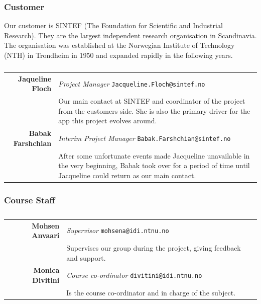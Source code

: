 \subsubsection{Customer}
Our customer is SINTEF (The Foundation for Scientific and Industrial Research). They are the largest independent research organisation in Scandinavia. The organisation was established at the Norwegian Institute of Technology (NTH) in Trondheim in 1950 and expanded rapidly in the following years.

\begin{table}[!ht]
\begin{tabular}{r|p{11cm}}
\textbf{Jaqueline Floch} & \emph{Project Manager}   \texttt{Jacqueline.Floch@sintef.no}\\[4pt]
& Our main contact at SINTEF and coordinator of the project from the customers side. She is also the primary driver for the app this project evolves around. \\[8pt]
\textbf{Babak Farshchian} & \emph{Interim Project Manager}   \texttt{Babak.Farshchian@sintef.no}\\[4pt]
& After some unfortunate events made Jacqueline unavailable in the very beginning, Babak took over for a period of time until Jacqueline could return as our main contact. \\
\end{tabular}
\captionsetup{textformat=empty,labelformat=blank}
\caption[Customer]{}
\end{table}

\subsubsection{Course Staff}

\begin{table}[!ht]
\begin{tabular}{r|p{11cm}}
\textbf{Mohsen Anvaari} & \emph{Supervisor}   \texttt{mohsena@idi.ntnu.no}\\[6pt]
& Supervises our group during the project, giving feedback and support. \\[8pt]
\textbf{Monica Divitini} & \emph{Course co-ordinator}   \texttt{divitini@idi.ntnu.no}\\[6pt]
& Is the course co-ordinator and in charge of the subject.\\
\end{tabular}
\captionsetup{textformat=empty,labelformat=blank}
\caption[Course Staff]{}
\end{table}

